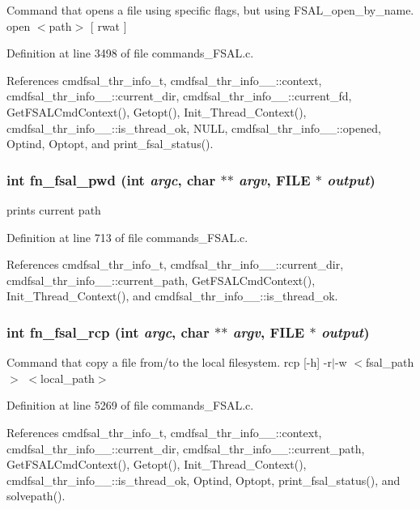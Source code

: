 Command that opens a file using specific flags, but using FSAL\_\-open\_\-by\_\-name. open $<$path$>$ [ rwat ] 

Definition at line 3498 of file commands\_\-FSAL.c.

References cmdfsal\_\-thr\_\-info\_\-t, cmdfsal\_\-thr\_\-info\_\-\_\-::context, cmdfsal\_\-thr\_\-info\_\-\_\-::current\_\-dir, cmdfsal\_\-thr\_\-info\_\-\_\-::current\_\-fd, Get\-FSALCmd\-Context(), Getopt(), Init\_\-Thread\_\-Context(), cmdfsal\_\-thr\_\-info\_\-\_\-::is\_\-thread\_\-ok, NULL, cmdfsal\_\-thr\_\-info\_\-\_\-::opened, Optind, Optopt, and print\_\-fsal\_\-status().
\subsubsection{\setlength{\rightskip}{0pt plus 5cm}int fn\_\-fsal\_\-pwd (int {\em argc}, char $\ast$$\ast$ {\em argv}, FILE $\ast$ {\em output})}\label{commands__FSAL_8c_a18}


prints current path 

Definition at line 713 of file commands\_\-FSAL.c.

References cmdfsal\_\-thr\_\-info\_\-t, cmdfsal\_\-thr\_\-info\_\-\_\-::current\_\-dir, cmdfsal\_\-thr\_\-info\_\-\_\-::current\_\-path, Get\-FSALCmd\-Context(), Init\_\-Thread\_\-Context(), and cmdfsal\_\-thr\_\-info\_\-\_\-::is\_\-thread\_\-ok.
\subsubsection{\setlength{\rightskip}{0pt plus 5cm}int fn\_\-fsal\_\-rcp (int {\em argc}, char $\ast$$\ast$ {\em argv}, FILE $\ast$ {\em output})}\label{commands__FSAL_8c_a44}


Command that copy a file from/to the local filesystem. rcp [-h] -r$|$-w $<$fsal\_\-path$>$ $<$local\_\-path$>$ 

Definition at line 5269 of file commands\_\-FSAL.c.

References cmdfsal\_\-thr\_\-info\_\-t, cmdfsal\_\-thr\_\-info\_\-\_\-::context, cmdfsal\_\-thr\_\-info\_\-\_\-::current\_\-dir, cmdfsal\_\-thr\_\-info\_\-\_\-::current\_\-path, Get\-FSALCmd\-Context(), Getopt(), Init\_\-Thread\_\-Context(), cmdfsal\_\-thr\_\-info\_\-\_\-::is\_\-thread\_\-ok, Optind, Optopt, print\_\-fsal\_\-status(), and solvepath().
